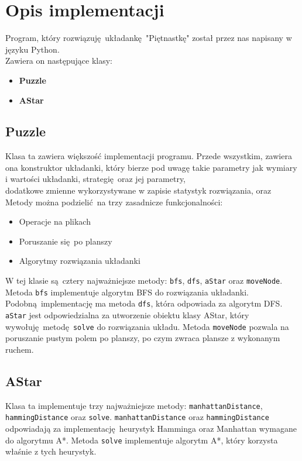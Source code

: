 \documentclass{classrep}
\begin{document}
\section{Opis implementacji}
Program, który rozwiązuję układankę "Piętnastkę" został przez nas napisany w języku Python.\\
Zawiera on następujące klasy:
\begin{itemize}
	\item \textbf{Puzzle}
	\item \textbf{AStar}
\end{itemize}
\newpage
\subsection{Puzzle}
Klasa ta zawiera większość implementacji programu. Przede wszystkim, zawiera ona konstruktor układanki, który bierze pod uwagę takie parametry jak wymiary i wartości układanki, strategię oraz jej parametry, \\dodatkowe zmienne wykorzystywane w zapisie statystyk rozwiązania, oraz \\
Metody można podzielić na trzy zasadnicze funkcjonalności:
\begin{itemize}
	\item Operacje na plikach
	\item Poruszanie się po planszy
	\item Algorytmy rozwiązania układanki
\end{itemize}
W tej klasie są cztery najważniejsze metody: \texttt{bfs}, \texttt{dfs}, \texttt{aStar} oraz \texttt{moveNode}.
Metoda \texttt{bfs} implementuje algorytm BFS do rozwiązania układanki. Podobną implementację ma metoda \texttt{dfs}, która odpowiada za algorytm DFS. \\
\texttt{aStar} jest odpowiedzialna za utworzenie obiektu klasy AStar, który wywołuję metodę \texttt{solve} do rozwiązania układu. Metoda \texttt{moveNode} pozwala na poruszanie pustym polem po planszy, po czym zwraca plansze z wykonanym ruchem.

\subsection{AStar}
Klasa ta implementuje trzy najważniejsze metody: \texttt{manhattanDistance}, \texttt{hammingDistance} oraz \texttt{solve}. \texttt{manhattanDistance} oraz \texttt{hammingDistance} odpowiadają za implementację heurystyk Hamminga oraz Manhattan wymagane do algorytmu A*. Metoda \texttt{solve} implementuje algorytm A*, który korzysta właśnie z tych heurystyk.
\end{document}
